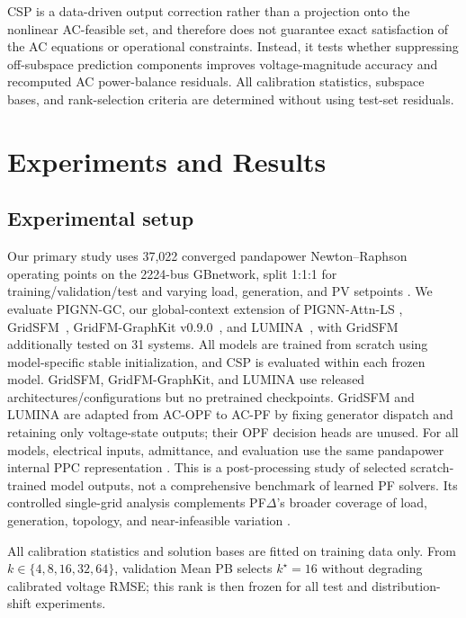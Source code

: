 \documentclass{article}
\begin{document}
CSP is a data-driven output correction rather than a projection onto the
nonlinear AC-feasible set, and therefore does not guarantee exact
satisfaction of the AC equations or operational constraints. Instead, it
tests whether suppressing off-subspace prediction components improves
voltage-magnitude accuracy and recomputed AC power-balance residuals.
All calibration statistics, subspace bases, and rank-selection criteria
are determined without using test-set residuals.

\section{Experiments and Results}
\label{sec:experiments}

\subsection{Experimental setup}
\label{sec:setup}

Our primary study uses 37,022 converged pandapower Newton--Raphson
operating points on the 2224-bus GBnetwork, split 1:1:1 for
training/validation/test and varying load, generation, and PV setpoints
\cite{tinney1967powerflow,thurner2018pandapower}.
We evaluate PIGNN-GC, our global-context extension of PIGNN-Attn-LS
\cite{kim2026pignn}, GridSFM~\cite{yang2026gridsfm},
GridFM-GraphKit v0.9.0~\cite{gridfmgraphkit2026}, and
LUMINA~\cite{li2026lumina}, with GridSFM additionally tested on 31 systems.
All models are trained from scratch using model-specific stable
initialization, and CSP is evaluated within each frozen model.
GridSFM, GridFM-GraphKit, and LUMINA use released architectures/configurations
but no pretrained checkpoints. GridSFM and LUMINA are adapted from AC-OPF to
AC-PF by fixing generator dispatch and retaining only voltage-state outputs;
their OPF decision heads are unused.
For all models, electrical inputs, admittance, and evaluation use the same
pandapower internal PPC representation
\cite{thurner2018pandapower,zimmerman2011matpower}.
This is a post-processing study of selected scratch-trained model outputs,
not a comprehensive benchmark of learned PF solvers. Its controlled
single-grid analysis complements PF$\Delta$'s broader coverage of load,
generation, topology, and near-infeasible variation \cite{rivera2025pfdelta}.

All calibration statistics and solution bases are fitted on training data
only. From $k\in\{4,8,16,32,64\}$, validation Mean PB selects
$k^\star=16$ without degrading calibrated voltage RMSE; this rank is then
frozen for all test and distribution-shift experiments.
\end{document}
